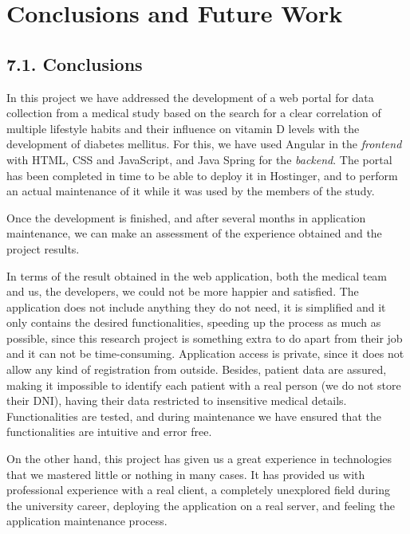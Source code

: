 \chapter*{Conclusions and Future Work}

\section*{7.1. Conclusions}
    In this project we have addressed the development of a web portal for data collection from a medical study based on the search for a clear correlation of multiple lifestyle habits and their influence on vitamin D levels with the development of diabetes mellitus. For this, we have used Angular in the \textit{frontend} with HTML, CSS and JavaScript, and Java Spring for the \textit{backend}. The portal has been completed in time to be able to deploy it in Hostinger, and to perform an actual maintenance of it while it was used by the members of the study.\newline

    Once the development is finished, and after several months in application maintenance, we can make an assessment of the experience obtained  and the project results. \newline

    In terms of the result obtained in the web application, both the medical team and us, the developers, we could not be more happier and satisfied. The application does not include anything they do not need, it is simplified and it only contains the desired functionalities, speeding up the process as much as possible, since this research project is something extra to do apart from their job and it can not be time-consuming. Application access is private, since it does not allow any kind of registration from outside. Besides, patient data are assured, making it impossible to identify each patient with a real person (we do not store their DNI), having their data restricted to insensitive medical details. Functionalities are tested, and during maintenance we have ensured that the functionalities are intuitive and error free. \newline
    
    On the other hand, this project has given us a great experience in technologies that we mastered little or nothing in many cases. It has provided us with professional experience with a real client, a completely unexplored field during the university career, deploying the application on a real server, and feeling the application maintenance process. \newline
   
